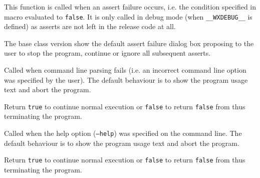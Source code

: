 
This function is called when an assert failure occurs, i.e. the condition
specified in  macro evaluated to {\tt false}.
It is only called in debug mode (when {\tt \_\_WXDEBUG\_\_} is defined) as
asserts are not left in the release code at all.

The base class version show the default assert failure dialog box proposing to
the user to stop the program, continue or ignore all subsequent asserts.







\label{wxapponcmdlineerror}


Called when command line parsing fails (i.e. an incorrect command line option
was specified by the user). The default behaviour is to show the program usage
text and abort the program.

Return {\tt true} to continue normal execution or {\tt false} to return 
{\tt false} from  thus terminating the program.




\label{wxapponcmdlinehelp}


Called when the help option ({\tt --help}) was specified on the command line.
The default behaviour is to show the program usage text and abort the program.

Return {\tt true} to continue normal execution or {\tt false} to return 
{\tt false} from  thus terminating the program.

